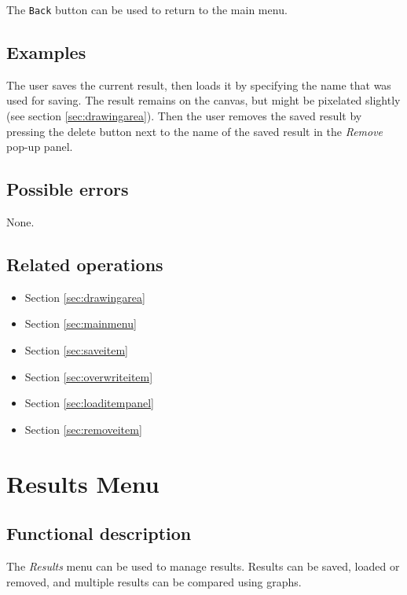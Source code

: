   The \texttt{Back} button can be used to return to the main menu.
  
  \subsection*{Examples}
  The user saves the current result, then loads it by specifying the name that was used for saving. The result remains on the canvas, but might be pixelated slightly (see section \ref{sec:drawingarea}). Then the user removes the saved result by pressing the delete button next to the name of the saved result in the \emph{Remove} pop-up panel.

  \subsection*{Possible errors}
  None.

  \subsection*{Related operations}
  \begin{itemize}
  \item Section \ref{sec:drawingarea}
    \item Section \ref{sec:mainmenu}
    \item Section \ref{sec:saveitem}
    \item Section \ref{sec:overwriteitem}
    \item Section \ref{sec:loaditempanel}
    \item Section \ref{sec:removeitem}
  \end{itemize}

\section{Results Menu}\label{sec:resultsmenu}
  \subsection*{Functional description}
  The \emph{Results} menu can be used to manage results. Results can be saved, loaded or removed, and multiple results can be compared using graphs. 


